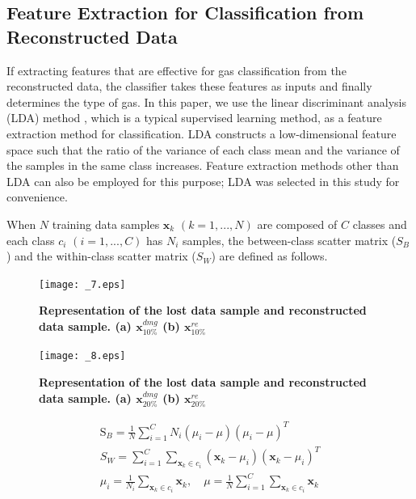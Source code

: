 \documentclass[10pt,letterpaper]{article}
\begin{document}
\subsection*{Feature Extraction for Classification from Reconstructed Data}

If extracting features that are effective for gas classification from the reconstructed data, the classifier takes these features as inputs and finally determines the type of gas. 
In this paper, we use the linear discriminant analysis (LDA) method \cite{fukunaga2013introduction}, which is a typical supervised learning method, as a feature extraction method for classification. 
LDA constructs a low-dimensional feature space such that the ratio of the variance of each class mean and the variance of the samples in the same class increases. Feature extraction methods other than LDA can also be employed for this purpose; LDA was selected in this study for convenience.

When $N$ training data samples $\textbf{x}_k$ $(k=1,...,N)$ are composed of $C$ classes and each class $c_i$ $(i=1,...,C)$ has $N_i$ samples, the between-class scatter matrix ($S_{B}$) and the within-class scatter matrix ($S_{W}$) are defined as follows.

\begin{figure}[t]
	\centering
    \texttt{[image: \_7.eps]}
    \caption{\bf{Representation of the lost data sample and reconstructed data sample. (a) $\textbf{x}_{10\%}^{dmg}$ (b) $\textbf{x}_{10\%}^{re}$}\label{fig. 7}}
\end{figure}

\begin{figure}[t]
	\centering
    \texttt{[image: \_8.eps]}
    \caption{\bf{Representation of the lost data sample and reconstructed data sample. (a) $\textbf{x}_{20\%}^{dmg}$ (b) $\textbf{x}_{20\%}^{re}$}\label{fig. 8}}
\end{figure}

\begin{gather}
\label{eq:sic13}
	\mathrm S_B = \frac{1}{N}\sum\limits_{i=1}^{C}N_i(\mu_i-\mu)(\mu_i-\mu)^T \nonumber\\
    S_W = \sum\limits_{i=1}^{C}\sum\limits_{\mathbf{x}_k\in{c}_{i}}^{ }(\mathbf{x}_k-\mu_i)(\mathbf{x}_k-\mu_i)^T \nonumber \\
    \mu_i = \frac{1}{N_i}\sum\limits_{{\mathbf{x}_k}\in{c_i}}^{}\mathbf{x}_k,\quad \mu = \frac{1}{N}\sum\limits_{i=1}^{C}\sum\limits_{{\mathbf{x}_k}\in{c_i}}^{}\mathbf{x}_k
\end{gather}
\end{document}
